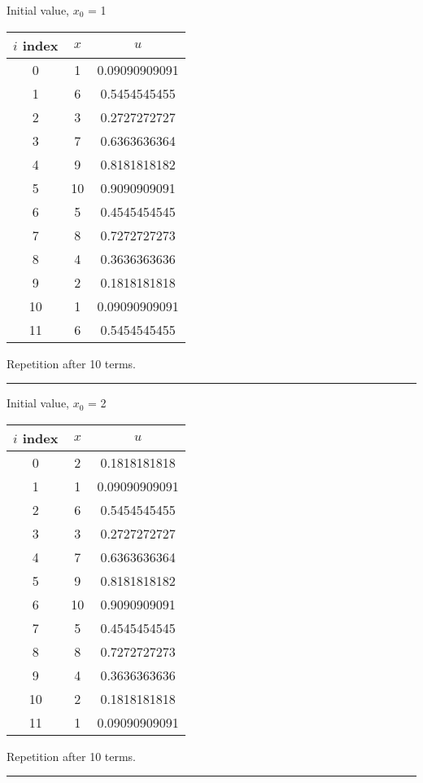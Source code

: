 \documentclass{article}
\begin{document}
Initial value, $x_0$ = 1
\begin{center} \begin{tabular}{||c | c | c||}  \hline
		$i$ index & $x$ & $u$ \\ [0.5ex] \hline \hline0 & 1 & 0.09090909091\\
		\hline 
		1 & 6 & 0.5454545455\\
		\hline 
		2 & 3 & 0.2727272727\\
		\hline 
		3 & 7 & 0.6363636364\\
		\hline 
		4 & 9 & 0.8181818182\\
		\hline 
		5 & 10 & 0.9090909091\\
		\hline 
		6 & 5 & 0.4545454545\\
		\hline 
		7 & 8 & 0.7272727273\\
		\hline 
		8 & 4 & 0.3636363636\\
		\hline 
		9 & 2 & 0.1818181818\\
		\hline 
		10 & 1 & 0.09090909091\\
		\hline 
		11 & 6 & 0.5454545455\\
		\hline 
	\end{tabular} 
\end{center} Repetition after 10 terms.
\\ \noindent\rule[0.5ex]{\linewidth}{1pt}
Initial value, $x_0$ = 2
\begin{center} \begin{tabular}{||c | c | c||}  \hline
		$i$ index & $x$ & $u$ \\ [0.5ex] \hline \hline0 & 2 & 0.1818181818\\
		\hline 
		1 & 1 & 0.09090909091\\
		\hline 
		2 & 6 & 0.5454545455\\
		\hline 
		3 & 3 & 0.2727272727\\
		\hline 
		4 & 7 & 0.6363636364\\
		\hline 
		5 & 9 & 0.8181818182\\
		\hline 
		6 & 10 & 0.9090909091\\
		\hline 
		7 & 5 & 0.4545454545\\
		\hline 
		8 & 8 & 0.7272727273\\
		\hline 
		9 & 4 & 0.3636363636\\
		\hline 
		10 & 2 & 0.1818181818\\
		\hline 
		11 & 1 & 0.09090909091\\
		\hline 
	\end{tabular} 
\end{center} Repetition after 10 terms.
\\ \noindent\rule[0.5ex]{\linewidth}{1pt}
\pagebreak
\end{document}
